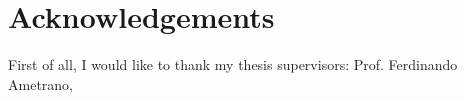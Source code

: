 \chapter{Acknowledgements}
First of all, I would like to thank my thesis supervisors: Prof. Ferdinando Ametrano, 